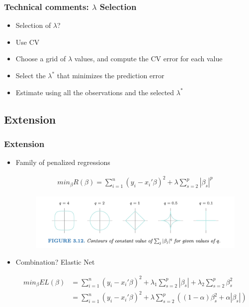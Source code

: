 \documentclass[
  shownotes,
  xcolor={svgnames},
  hyperref={colorlinks,citecolor=DarkBlue,linkcolor=DarkRed,urlcolor=DarkBlue}
  ]{beamer}
\begin{document}
\begin{frame}[fragile]
\frametitle{Technical comments: $\lambda$ Selection}
\begin{itemize}
 \item Selection of $\lambda$?
 \bigskip
 \item Use CV
 \bigskip
 \item Choose a grid of $\lambda$ values, and compute the CV error for each value
 \item Select the $\lambda^*$ that minimizes the prediction error
 \item Estimate using all the observations and the selected $\lambda^*$

\end{itemize}

\end{frame}

\subsection{Extension}
\begin{frame}[fragile]
\frametitle{Extension}

\begin{itemize}
\item Family of penalized regressions

\begin{align}
min_{\beta} R(\beta) = \sum_{i=1}^n (y_i-x_i'\beta)^2 + \lambda \sum_{s=2}^p |\beta_s|^p
\end{align}

 \begin{figure}[H] \centering
            \captionsetup{justification=centering}
              \includegraphics[scale=0.4]{figures/penalties.png}
 \end{figure}
\item  Combination? Elastic Net

\begin{align}
min_{\beta} EL(\beta) &= \sum_{i=1}^n (y_i-x_i'\beta)^2 + \lambda_1 \sum_{s=2}^p |\beta_s| + \lambda_2 \sum_{s=2}^p \beta_s^2 \nonumber \\
 &= \sum_{i=1}^n (y_i-x_i'\beta)^2 + \lambda \sum_{s=2}^p \left(  (1-\alpha) \beta_s^2 + \alpha  |\beta_s|\right)
\end{align}

\end{itemize}
\end{frame}
\end{document}
